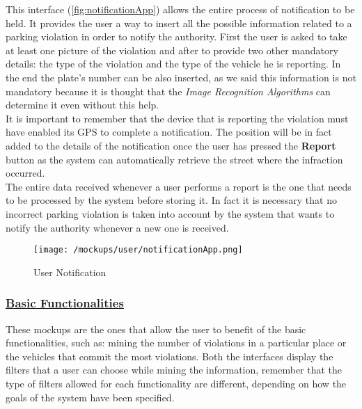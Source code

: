 			This interface (\autoref{fig:notificationApp}) allows the entire process of notification to be held. It provides the user a way to insert all the possible information related to a parking violation in order to notify the authority. First the user is asked to take at least one picture of the violation and after to provide two other mandatory details: the type of the violation and the type of the vehicle he is reporting. In the end the plate's number can be also inserted, as we said this information is not mandatory because it is thought that the \emph{Image Recognition Algorithms} can determine it even without this help.\\
			
			It is important to remember that the device that is reporting the violation must have enabled its GPS to complete a notification. The position will be in fact added to the details of the notification once the user has pressed the \textbf{Report} button as the system can automatically retrieve the street where the infraction occurred.\\
			
			The entire data received whenever a user performs a report is the one that needs to be processed by the system before storing it. In fact it is necessary that no incorrect parking violation is taken into account by the system that wants to notify the authority whenever a new one is received.
			
			\newpage
			
			\begin{figure}[ht!]
				\centering
				\texttt{[image: /mockups/user/notificationApp.png]}
				\caption{\label{fig:notificationApp} User Notification}
			\end{figure}
		
		\subsubsection[Basic Functionalities]{\hyperlink{toc}{Basic Functionalities}}
			\label{sec:userBasicFunctionalities}
			
			These mockups are the ones that allow the user to benefit of the basic functionalities, such as: mining the number of violations in a particular place or the vehicles that commit the most violations. Both the interfaces display the filters that a user can choose while mining the information, remember that the type of filters allowed for each functionality are different, depending on how the goals of the system have been specified.
			
